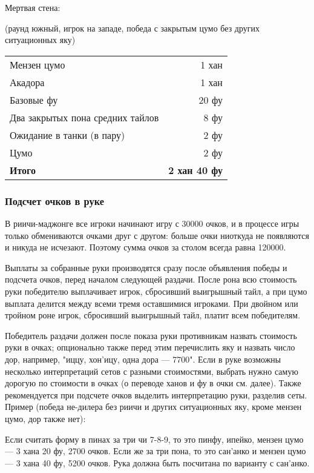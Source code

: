 Мертвая стена: 

(раунд южный, игрок на западе, победа с закрытым цумо без других ситуационных яку)

\noindent\begin{tabular}{lr}
	Мензен цумо & 1 хан \\
	Акадора & 1 хан \\
	Базовые фу & 20 фу \\
	Два закрытых пона средних тайлов & 8 фу \\
	Ожидание в танки (в пару) & 2 фу \\
	Цумо & 2 фу \\
	\midrule
	\textbf{Итого} & \textbf{2 хан 40 фу} \\
\end{tabular}

\subsubsection{Подсчет очков в руке}

В риичи-маджонге все игроки начинают игру с 30000 очков, и в процессе игры только обмениваются очками друг с другом: больше очки ниоткуда не появляются и никуда не исчезают. Поэтому сумма очков за столом всегда равна 120000.

Выплаты за собранные руки производятся сразу после объявления победы и подсчета очков, перед началом следующей раздачи. После рона всю стоимость руки победителю выплачивает игрок, сбросивший выигрышный тайл, а при цумо выплата делится между всеми тремя оставшимися игроками. При двойном или тройном роне игрок, сбросивший выигрышный тайл, платит всем победителям.

Победитель раздачи должен после показа руки противникам назвать стоимость руки в очках; опционально также перед этим перечислить яку и назвать число дор, например, "иццу, хон’ицу, одна дора --- 7700". Если в руке возможны несколько интерпретаций сетов с разными стоимостями, выбрать нужно самую дорогую по стоимости в очках (о переводе ханов и фу в очки см. далее). Также рекомендуется при подсчете очков выделить интерпретацию руки, разделив сеты. Пример (победа не-дилера без риичи и других ситуационных яку, кроме мензен цумо, дор также нет):


Если считать форму в пинах за три чи 7-8-9, то это пинфу, ипейко, мензен цумо --- 3 хана 20 фу, 2700 очков. Если же за три пона, то это сан’анко и мензен цумо --- 3 хана 40 фу, 5200 очков. Рука должна быть посчитана по варианту с сан’анко.

